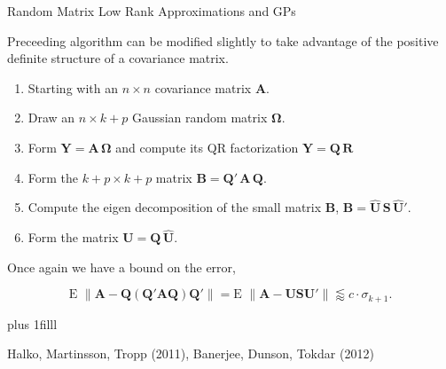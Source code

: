 \documentclass[11pt,ignorenonframetext,]{beamer}
\newcommand{\vvfill}{\vskip0pt plus 1filll}
\begin{document}
\begin{frame}{Random Matrix Low Rank Approximations and GPs}

Preceeding algorithm can be modified slightly to take advantage of the
positive definite structure of a covariance matrix.

\begin{enumerate}
\def\labelenumi{\arabic{enumi}.}
\item
  Starting with an \(n \times n\) covariance matrix \(\bm{A}\).
\item
  Draw an \(n \times k+p\) Gaussian random matrix \(\bm{\Omega}\).
\item
  Form \(\bm{Y} = \bm{A}\,\bm{\Omega}\) and compute its QR factorization
  \(\bm{Y} = \bm{Q}\,\bm{R}\)
\item
  Form the \(k+p \times k+p\) matrix
  \(\bm{B}=\bm{Q}'\,\bm{A} \, \bm{Q}\).
\item
  Compute the eigen decomposition of the small matrix \(\bm{B}\),
  \(\bm{B} = \bm{\hat{U}}\,\bm{S}\,\bm{\hat{U}}'\).
\item
  Form the matrix \(\bm{U} = \bm{Q} \, \bm{\hat{U}}\).
\end{enumerate}

Once again we have a bound on the error,

\[
   \text{E } \| \bm{A} - \bm{Q}(\bm{Q}'\bm{A}\bm{Q})\bm{Q}'\| 
 = \text{E } \| \bm{A} - \bm{U}\bm{S}\bm{U}'\| 
\lessapprox c \cdot \sigma_{k+1}. 
\]

\vvfill

\footnotesize

\begin{center}
Halko, Martinsson, Tropp (2011), Banerjee, Dunson, Tokdar (2012)
\end{center}

\end{frame}
\end{document}
